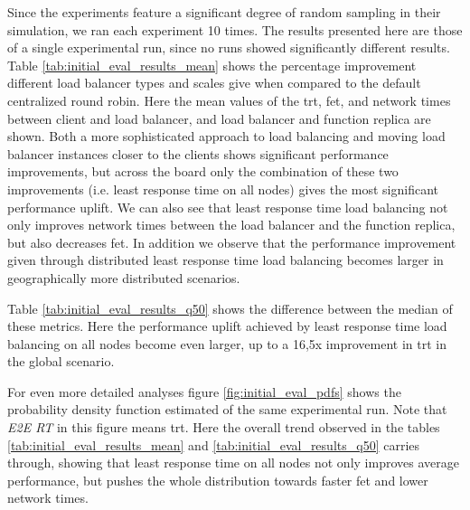 Since the experiments feature a significant degree of random sampling in their simulation, we ran each experiment 10 times.
The results presented here are those of a single experimental run, since no runs showed significantly different results.
Table \ref{tab:initial_eval_results_mean} shows the percentage improvement different load balancer types and scales give when compared to the default centralized round robin.
Here the mean values of the \gls{trt}, \gls{fet}, and network times between client and load balancer, and load balancer and function replica are shown.
Both a more sophisticated approach to load balancing and moving load balancer instances closer to the clients shows significant performance improvements, but across the board only the combination of these two improvements (i.e. least response time on all nodes) gives the most significant performance uplift.
We can also see that least response time load balancing not only improves network times between the load balancer and the function replica, but also decreases \gls{fet}.
In addition we observe that the performance improvement given through distributed least response time load balancing becomes larger in geographically more distributed scenarios.

Table \ref{tab:initial_eval_results_q50} shows the difference between the median of these metrics.
Here the performance uplift achieved by least response time load balancing on all nodes become even larger, up to a 16,5x improvement in \gls{trt} in the global scenario.

For even more detailed analyses figure \ref{fig:initial_eval_pdfs} shows the probability density function estimated of the same experimental run.
Note that \textit{E2E RT} in this figure means \gls{trt}.
Here the overall trend observed in the tables \ref{tab:initial_eval_results_mean} and \ref{tab:initial_eval_results_q50} carries through, showing that least response time on all nodes not only improves average performance, but pushes the whole distribution towards faster \gls{fet} and lower network times.